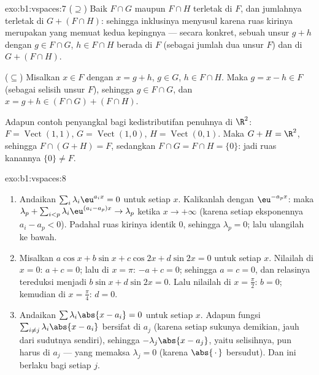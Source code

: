 \begin{solution}{exo:b1:vspaces:7}
($\supseteq$) Baik $F \cap G$ maupun $F \cap H$ terletak di $F$, dan
jumlahnya terletak di $G + (F \cap H)$: sehingga inklusinya menyusul karena ruas kirinya
merupakan  yang memuat kedua kepingnya --- secara konkret, sebuah unsur $g +
h$ dengan $g \in F\cap G$, $h \in F \cap H$ berada di $F$ (sebagai jumlah dua
unsur $F$) dan di $G + (F \cap H)$.

($\subseteq$) Misalkan $x \in F$ dengan $x = g + h$, $g \in G$, $h \in F
\cap H$. Maka $g = x - h \in F$ (sebagai selisih unsur $F$), sehingga
$g \in F \cap G$, dan $x = g + h \in (F \cap G) + (F \cap H)$.

Adapun contoh penyangkal bagi kedistributifan penuhnya di $\R^2$: $F =
\operatorname{Vect}(1,1)$, $G = \operatorname{Vect}(1,0)$, $H =
\operatorname{Vect}(0,1)$. Maka $G + H = \R^2$, sehingga $F \cap (G+H) =
F$, sedangkan $F \cap G = F \cap H = \{0\}$: jadi ruas kanannya $\{0\}
\neq F$.
\end{solution}

\begin{solution}{exo:b1:vspaces:8}
\begin{enumerate}
  \item Andaikan $\sum_{i} \lambda_i \eu^{a_i x} = 0$ untuk setiap $x$.
        Kalikanlah dengan $\eu^{-a_p x}$: maka $\lambda_p + \sum_{i < p}
        \lambda_i \eu^{(a_i - a_p)x} \to \lambda_p$ ketika $x \to
        +\infty$ (karena setiap eksponennya $a_i - a_p < 0$). Padahal ruas kirinya
        identik $0$, sehingga $\lambda_p = 0$; lalu ulangilah ke bawah.
  \item Misalkan $a\cos x + b \sin x + c \cos 2x + d\sin 2x = 0$ untuk setiap
        $x$. Nilailah di $x = 0$: $a + c = 0$; lalu di $x = \pi$: $-a + c
        = 0$; sehingga $a = c = 0$, dan relasinya tereduksi menjadi $b\sin
        x + d \sin 2x = 0$. Lalu nilailah di $x = \frac\pi2$: $b = 0$;
        kemudian di $x = \frac\pi4$: $d = 0$.
  \item Andaikan $\sum \lambda_i \abs{x - a_i} = 0$ untuk setiap $x$. Adapun
        fungsi $\sum_{i \neq j} \lambda_i\abs{x - a_i}$ bersifat
         di $a_j$ (karena setiap sukunya demikian, jauh dari
        sudutnya sendiri), sehingga $-\lambda_j \abs{x - a_j}$, yaitu selisihnya,
        pun harus  di $a_j$ --- yang memaksa
        $\lambda_j = 0$ (karena $\abs{\,\cdot\,}$ bersudut). Dan ini berlaku
        bagi setiap $j$.
\end{enumerate}
\end{solution}

